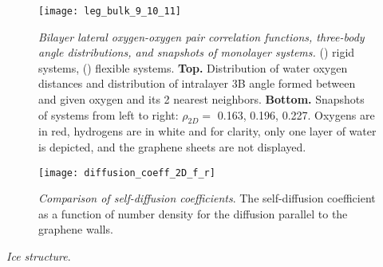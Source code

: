 \documentclass[12pt]{article}
\begin{document}
\begin{figure}[h!]
	\centering
	\texttt{[image: leg\_bulk\_9\_10\_11]}\\
	\caption{\textit{Bilayer lateral oxygen-oxygen pair correlation functions, three-body angle distributions, and snapshots of monolayer systems.} (\protect{}) rigid systems, (\protect{}) flexible systems. \textbf{Top.} Distribution of water oxygen distances and distribution of intralayer 3B angle formed between and given oxygen and its 2 nearest neighbors. \textbf{Bottom.} Snapshots of systems from left to right: \(\rho_{2D}=\) 0.163, 0.196, 0.227. Oxygens are in red, hydrogens are in white and for clarity, only one layer of water is depicted, and the graphene sheets are not displayed.}
	\label{fig:struct_9_10_11}
\end{figure}

\begin{figure}[h!]
	\centering
    \texttt{[image: diffusion\_coeff\_2D\_f\_r]}
	\caption{\textit{Comparison of self-diffusion coefficients}. The self-diffusion coefficient as a function of number density for the diffusion parallel to the graphene walls.}
	\label{fig:msd}
\end{figure}

\textit{Ice structure}.
\end{document}
